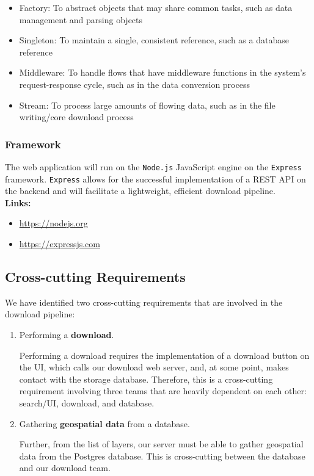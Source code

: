 \documentclass{article}
\begin{document}
\begin{itemize} 
	\item Factory: To abstract objects that may share common tasks, such as data management and parsing objects
	\item Singleton: To maintain a single, consistent reference, such as a database reference
	\item Middleware: To handle flows that have middleware functions in the system's request-response cycle, such as in the data conversion process
	\item Stream: To process large amounts of flowing data, such as in the file writing/core download process
\end{itemize}


\subsubsection{Framework}

The web application will run on the \texttt{Node.js} JavaScript engine on the \texttt{Express} framework. \texttt{Express} allows for the successful implementation of a REST API on the backend and will facilitate a lightweight, efficient download pipeline. \\

\textbf{Links:}
\begin{itemize} 
	\item \url{https://nodejs.org}
	\item \url{https://expressjs.com}
\end{itemize}

\clearpage

\subsection{Cross-cutting Requirements}

We have identified two cross-cutting requirements that are involved in the download pipeline:  

\begin{enumerate}
\item Performing a \textbf{download}.

Performing a download requires the implementation of a download button on the UI, which calls our download web server, and, at some point, makes contact with the storage database. Therefore, this is a cross-cutting requirement involving three teams that are heavily dependent on each other: search/UI, download, and database. \\

\item Gathering \textbf{geospatial data} from a database.

Further, from the list of layers, our server must be able to gather geospatial data from the Postgres database. This is cross-cutting between the database and our download team.

\end{enumerate}
\end{document}
